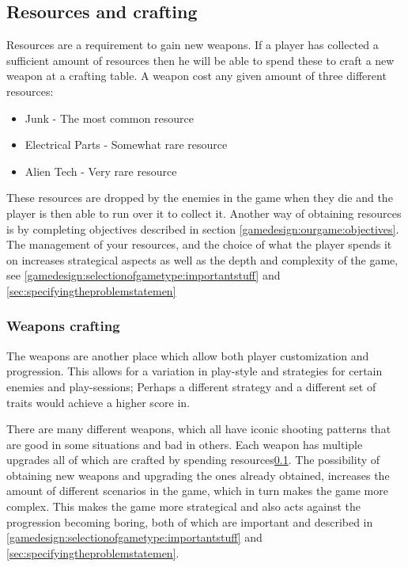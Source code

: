 \subsection{Resources and crafting}\label{gamedesign:ourgame:crafting}
Resources are a requirement to gain new weapons.
If a player has collected a sufficient amount of resources then he will be able to spend these to craft a new weapon at a crafting table.
A weapon cost any given amount of three different resources:
\begin{itemize}
\item Junk - The most common resource
\item Electrical Parts - Somewhat rare resource
\item Alien Tech - Very rare resource
\end{itemize}

These resources are dropped by the enemies in the game when they die and the player is then able to run over it to collect it. Another way of obtaining resources is by completing objectives described in section \ref{gamedesign:ourgame:objectives}. 
The management of your resources, and the choice of what the player spends it on increases strategical aspects as well as the depth and complexity of the game, see \ref{gamedesign:selectionofgametype:importantstuff} and \ref{sec:specifyingtheproblemstatemen}

\subsubsection*{Weapons crafting}\label{gamedesign:ourgame:weapons}
The weapons are another place which allow both player customization and progression. This allows for a variation in play-style and strategies for certain enemies and play-sessions; Perhaps a different strategy and a different set of traits would achieve a higher score in.

There are many different weapons, which all have iconic shooting patterns that are good in some situations and bad in others.
Each weapon has multiple upgrades all of which are crafted by spending resources\ref{gamedesign:ourgame:crafting}. The possibility of obtaining new weapons and upgrading the ones already obtained, increases the amount of different scenarios in the game, which in turn makes the game more complex. This makes the game more strategical and also acts against the progression becoming boring, both of which are important and described in \ref{gamedesign:selectionofgametype:importantstuff} and \ref{sec:specifyingtheproblemstatemen}.

